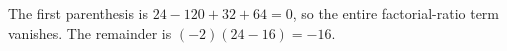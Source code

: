 The first parenthesis is $24-120+32+64=0$, so the entire factorial-ratio term vanishes. The remainder is $(-2)(24-16)=\boxed{-16}$.
